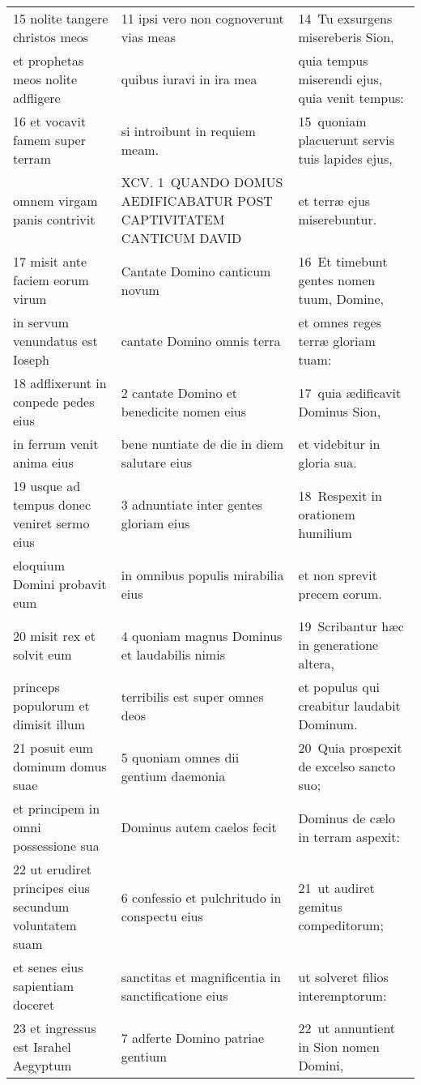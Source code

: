 \documentclass{article}
\begin{document}
\begin{longtable}{@{}p{}p{}p{}@{}}
15 nolite tangere christos meos	&	11 ipsi vero non cognoverunt vias meas	&	14 Tu exsurgens misereberis Sion,	\\
et prophetas meos nolite adfligere	&	quibus iuravi in ira mea	&	quia tempus miserendi ejus, quia venit tempus:	\\
16 et vocavit famem super terram	&	si introibunt in requiem meam.	&	15 quoniam placuerunt servis tuis lapides ejus,	\\
omnem virgam panis contrivit	&	XCV. 1 QUANDO DOMUS AEDIFICABATUR POST CAPTIVITATEM CANTICUM DAVID	&	et terræ ejus miserebuntur.	\\
17 misit ante faciem eorum virum	&	Cantate Domino canticum novum	&	16 Et timebunt gentes nomen tuum, Domine,	\\
in servum venundatus est Ioseph	&	cantate Domino omnis terra	&	et omnes reges terræ gloriam tuam:	\\
18 adflixerunt in conpede pedes eius	&	2 cantate Domino et benedicite nomen eius	&	17 quia ædificavit Dominus Sion,	\\
in ferrum venit anima eius	&	bene nuntiate de die in diem salutare eius	&	et videbitur in gloria sua.	\\
19 usque ad tempus donec veniret sermo eius	&	3 adnuntiate inter gentes gloriam eius	&	18 Respexit in orationem humilium	\\
eloquium Domini probavit eum	&	in omnibus populis mirabilia eius	&	et non sprevit precem eorum.	\\
20 misit rex et solvit eum	&	4 quoniam magnus Dominus et laudabilis nimis	&	19 Scribantur hæc in generatione altera,	\\
princeps populorum et dimisit illum	&	terribilis est super omnes deos	&	et populus qui creabitur laudabit Dominum.	\\
21 posuit eum dominum domus suae	&	5 quoniam omnes dii gentium daemonia	&	20 Quia prospexit de excelso sancto suo;	\\
et principem in omni possessione sua	&	Dominus autem caelos fecit	&	Dominus de cælo in terram aspexit:	\\
22 ut erudiret principes eius secundum voluntatem suam	&	6 confessio et pulchritudo in conspectu eius	&	21 ut audiret gemitus compeditorum;	\\
et senes eius sapientiam doceret	&	sanctitas et magnificentia in sanctificatione eius	&	ut solveret filios interemptorum:	\\
23 et ingressus est Israhel Aegyptum	&	7 adferte Domino patriae gentium	&	22 ut annuntient in Sion nomen Domini,	\\

\end{longtable}
\end{document}
